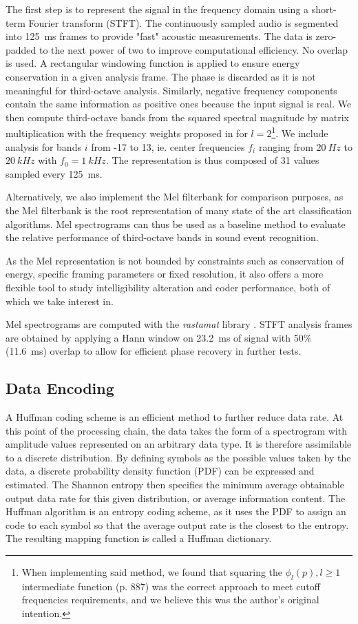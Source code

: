 \documentclass[final,3p,times,twocolumn]{elsarticle}
\begin{document}
The first step is to represent the signal in the frequency domain using a short-term Fourier transform (STFT). The continuously sampled audio is segmented into 125~ms frames to provide "fast" acoustic measurements. The data is zero-padded to the next power of two to improve computational efficiency. No overlap is used. A rectangular windowing function is applied to ensure energy conservation in a given analysis frame. The phase is discarded as it is not meaningful for third-octave analysis. Similarly, negative frequency components contain the same information as positive ones because the input signal is real. We then compute third-octave bands from the squared spectral magnitude by matrix multiplication with the frequency weights proposed in \cite{antoni2010} for $l = 2$\footnote{When implementing said method, we found that squaring the $\phi_l(p), l \geq 1$ intermediate function (p. 887) was the correct approach to meet cutoff frequencies requirements, and we believe this was the author's original intention.}. We include analysis for bands $i$ from -17 to 13, ie. center frequencies $f_i$ ranging from $20~Hz$ to $20~kHz$ with $f_0 = 1~kHz$. The representation is thus composed of 31 values sampled every 125~ms.

Alternatively, we also implement the Mel filterbank for comparison purposes, as the Mel filterbank is the root representation of many state of the art classification algorithms. Mel spectrograms can thus be used as a baseline method to evaluate the relative performance of third-octave bands in sound event recognition.

As the Mel representation is not bounded by constraints such as conservation of energy, specific framing parameters or fixed resolution, it also offers a more flexible tool to study intelligibility alteration and coder performance, both of which we take interest in.

Mel spectrograms are computed with the \textit{rastamat} library \cite{ellis2005}. STFT analysis frames are obtained by applying a Hann window on 23.2~ms of signal with 50\% (11.6~ms) overlap to allow for efficient phase recovery in further tests.

\subsection{Data Encoding}

A Huffman coding scheme \cite{huffman1952} is an efficient method to further reduce data rate. At this point of the processing chain, the data takes the form of a spectrogram with amplitude values represented on an arbitrary data type. It is therefore assimilable to a discrete distribution. By defining symbols as the possible values taken by the data, a discrete probability density function (PDF) can be expressed and estimated. The Shannon entropy then specifies the minimum average obtainable output data rate for this given distribution, or average information content. The Huffman algorithm is an entropy coding scheme, as it uses the PDF to assign an code to each symbol so that the average output rate is the closest to the entropy. The resulting mapping function is called a Huffman dictionary.
\end{document}
